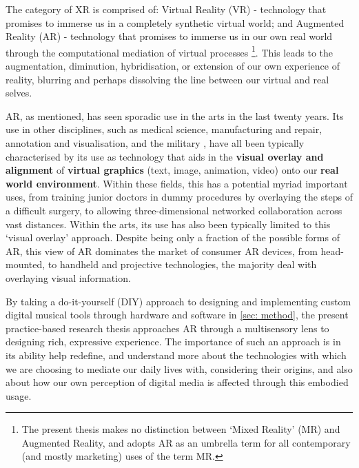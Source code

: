 The category of XR is comprised of: Virtual Reality (VR) - technology that promises to immerse us in a completely synthetic virtual world; and Augmented Reality (AR) - technology that promises to immerse us in our own real world through the computational mediation of virtual processes \footnote{The present thesis makes no distinction between `Mixed Reality' (MR) and Augmented Reality, and adopts AR as an umbrella term for all contemporary (and mostly marketing) uses of the term MR.}. This leads to the augmentation, diminution, hybridisation, or extension of our own experience of reality, blurring and perhaps dissolving the line between our virtual and real selves.

AR, as mentioned, has seen sporadic use in the arts in the last twenty years. Its use in other disciplines, such as medical science, manufacturing and repair, annotation and visualisation, and the military \citep{azuma1997}, have all been typically characterised by its use as technology that aids in the \textbf{visual overlay and alignment} of \textbf{virtual graphics} (text, image, animation, video) onto our \textbf{real world environment}. Within these fields, this has a potential myriad important uses, from training junior doctors in dummy procedures by overlaying the steps of a difficult surgery, to allowing three-dimensional networked collaboration across vast distances. Within the arts, its use has also been typically limited to this `visual overlay' approach. Despite being only a fraction of the possible forms of AR, this view of AR dominates the market of consumer AR devices, from head-mounted, to handheld and projective technologies, the majority deal with overlaying visual information. 

By taking a do-it-yourself (DIY) approach to designing and implementing custom digital musical tools through hardware and software in \autoref{sec: method}, the present practice-based research thesis approaches AR through a multisensory lens to designing rich, expressive experience. The importance of such an approach is in its ability help redefine, and understand more about the technologies with which we are choosing to mediate our daily lives with, considering their origins, and also about how our own perception of digital media is affected through this embodied usage. 



